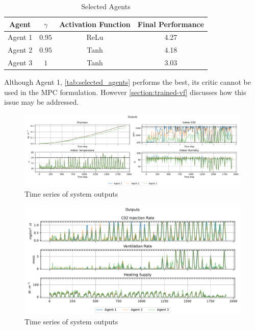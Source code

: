 \begin{table}[h]
    \centering
    \begin{tabular}{|c|c|c|c|}
    \hline
         Agent & $\gamma$ & Activation Function & Final Performance \\
         \hline
         Agent 1& $0.95$ & ReLu & 4.27 \\
         Agent 2& $0.95$ & Tanh & 4.18 \\
         Agent 3& $1$ & Tanh & 3.03 \\
         \hline
    \end{tabular}
    \caption{Selected Agents}
    \label{tab:selected_agents}
\end{table}

Although Agent 1, \autoref{tab:selected_agents} performs the best, its critic cannot be used in the MPC formulation. However \autoref{section:trained-vf} discusses how this issue may be addressed. 

\begin{figure}[H]
    \centering
    \includegraphics[width = \textwidth]{figures/selected_policies_outputs.pdf}
    \caption{Time series of system outputs}
    \label{fig:selected-policies-outputs}
\end{figure}



\begin{figure}[H]
    \centering
    \includegraphics[width = \textwidth]{figures/selected_policies_inputs.pdf}
    \caption{Time series of system outputs}
    \label{fig:selected-policies-inputs}
\end{figure}

